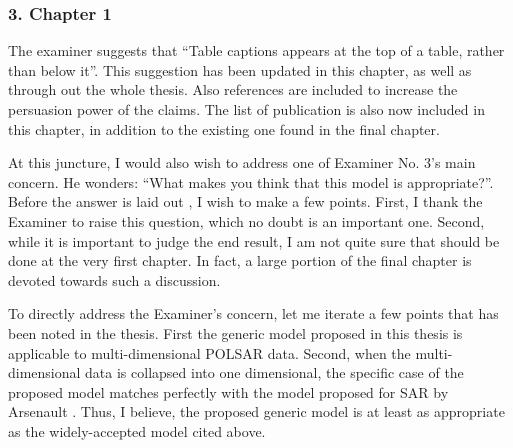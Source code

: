 \subsubsection*{3. Chapter 1}

The examiner suggests that ``Table captions appears at the top of a table, rather than below it''. 
This suggestion has been updated in this chapter, as well as through out the whole thesis.
Also references are included to increase the persuasion power of the claims.
The list of publication is also now included in this chapter, in addition to the existing one found in the final chapter.

At this juncture, I would also wish to address one of Examiner No. 3's main concern.
He wonders: ``What makes you think that this model is appropriate?''.
Before the answer is laid out , I wish to make a few points.
First, I thank the Examiner to raise this question, which no doubt is an important one. 
Second, while it is important to judge the end result, 
  I am not quite sure that should be done at the very first chapter.
In fact, a large portion of the final chapter is devoted towards such a discussion.

To directly address the Examiner's concern, let me iterate a few points that has been noted in the thesis.
First the generic model proposed in this thesis is applicable to multi-dimensional POLSAR data.
Second, when the multi-dimensional data is collapsed into one dimensional, 
  the specific case of the proposed model matches perfectly with the model proposed for SAR by Arsenault \cite{Arsenault_JOptSocAm_1976}. 
Thus, I believe, the proposed generic model is at least as appropriate as the widely-accepted model cited above.


